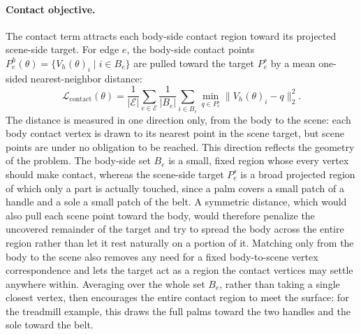 \paragraph{Contact objective.} The contact term attracts each body-side contact region toward its projected scene-side target. For edge $e$, the body-side contact points $P_e^h(\theta) = \{ V_h(\theta)_i \mid i \in B_e \}$ are pulled toward the target $P_e^s$ by a mean one-sided nearest-neighbor distance:
\begin{equation}
\label{eq:contact-loss}
\mathcal{L}_{\mathrm{contact}}(\theta)
=
\frac{1}{|\mathcal{E}|}
\sum_{e \in \mathcal{E}}
\frac{1}{|B_e|}
\sum_{i \in B_e}
\min_{q \in P_e^s}
\bigl\lVert V_h(\theta)_i - q \bigr\rVert_2^2 .
\end{equation}
The distance is measured in one direction only, from the body to the scene: each body contact vertex is drawn to its nearest point in the scene target, but scene points are under no obligation to be reached. This direction reflects the geometry of the problem. The body-side set $B_e$ is a small, fixed region whose every vertex should make contact, whereas the scene-side target $P_e^s$ is a broad projected region of which only a part is actually touched, since a palm covers a small patch of a handle and a sole a small patch of the belt. A symmetric distance, which would also pull each scene point toward the body, would therefore penalize the uncovered remainder of the target and try to spread the body across the entire region rather than let it rest naturally on a portion of it. Matching only from the body to the scene also removes any need for a fixed body-to-scene vertex correspondence and lets the target act as a region the contact vertices may settle anywhere within. Averaging over the whole set $B_e$, rather than taking a single closest vertex, then encourages the entire contact region to meet the surface: for the treadmill example, this draws the full palms toward the two handles and the sole toward the belt.

